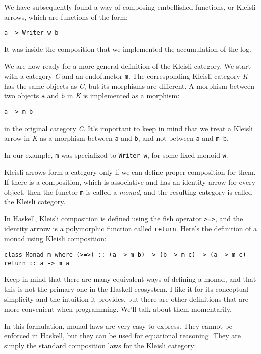 We have subsequently found a way of composing embellished functions, or
Kleisli arrows, which are functions of the form:

\begin{verbatim}
a -> Writer w b
\end{verbatim}

It was inside the composition that we implemented the accumulation of
the log.

We are now ready for a more general definition of the Kleisli category.
We start with a category \emph{C} and an endofunctor \texttt{m}. The
corresponding Kleisli category \emph{K} has the same objects as
\emph{C}, but its morphisms are different. A morphism between two
objects \texttt{a} and \texttt{b} in \emph{K} is implemented as a
morphism:

\begin{verbatim}
a -> m b
\end{verbatim}

in the original category \emph{C}. It's important to keep in mind that
we treat a Kleisli arrow in \emph{K} as a morphism between \texttt{a}
and \texttt{b}, and not between \texttt{a} and \texttt{m\ b}.

In our example, \texttt{m} was specialized to \texttt{Writer\ w}, for
some fixed monoid \texttt{w}.

Kleisli arrows form a category only if we can define proper composition
for them. If there is a composition, which is associative and has an
identity arrow for every object, then the functor \texttt{m} is called a
\emph{monad}, and the resulting category is called the Kleisli category.

In Haskell, Kleisli composition is defined using the fish operator
\texttt{\textgreater{}=\textgreater{}}, and the identity arrrow is a
polymorphic function called \texttt{return}. Here's the definition of a
monad using Kleisli composition:

\begin{verbatim}
class Monad m where (>=>) :: (a -> m b) -> (b -> m c) -> (a -> m c) return :: a -> m a
\end{verbatim}

Keep in mind that there are many equivalent ways of defining a monad,
and that this is not the primary one in the Haskell ecosystem. I like it
for its conceptual simplicity and the intuition it provides, but there
are other definitions that are more convenient when programming. We'll
talk about them momentarily.

In this formulation, monad laws are very easy to express. They cannot be
enforced in Haskell, but they can be used for equational reasoning. They
are simply the standard composition laws for the Kleisli category:


